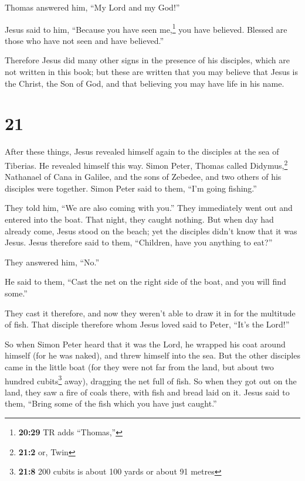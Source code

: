  Thomas answered him, ``My Lord and my God!''

 Jesus said to him, ``Because you have seen
me,\footnote{\textbf{20:29} TR adds ``Thomas,''} you have believed.
Blessed are those who have not seen and have believed.''

 Therefore Jesus did many other signs in the presence of
his disciples, which are not written in this book;  but
these are written that you may believe that Jesus is the Christ, the Son
of God, and that believing you may have life in his name.

\hypertarget{section-20}{%
\section{21}\label{section-20}}

 After these things, Jesus revealed himself again to the
disciples at the sea of Tiberias. He revealed himself this way.
 Simon Peter, Thomas called Didymus,\footnote{\textbf{21:2}
  or, Twin} Nathanael of Cana in Galilee, and the sons of Zebedee, and
two others of his disciples were together.  Simon Peter
said to them, ``I'm going fishing.''

They told him, ``We are also coming with you.'' They immediately went
out and entered into the boat. That night, they caught nothing.
 But when day had already come, Jesus stood on the beach;
yet the disciples didn't know that it was Jesus.  Jesus
therefore said to them, ``Children, have you anything to eat?''

They answered him, ``No.''

 He said to them, ``Cast the net on the right side of the
boat, and you will find some.''

They cast it therefore, and now they weren't able to draw it in for the
multitude of fish.  That disciple therefore whom Jesus
loved said to Peter, ``It's the Lord!''

So when Simon Peter heard that it was the Lord, he wrapped his coat
around himself (for he was naked), and threw himself into the sea.
 But the other disciples came in the little boat (for they
were not far from the land, but about two hundred cubits\footnote{\textbf{21:8}
  200 cubits is about 100 yards or about 91 metres} away), dragging the
net full of fish.  So when they got out on the land, they
saw a fire of coals there, with fish and bread laid on it.
 Jesus said to them, ``Bring some of the fish which you
have just caught.''

